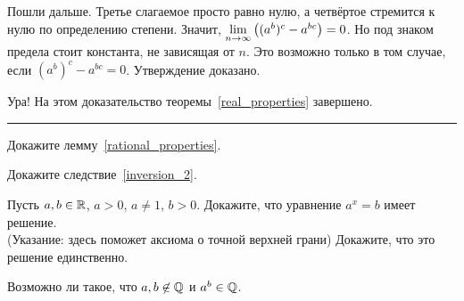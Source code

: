 \documentclass[a4paper,12pt,fleqn]{article}
\begin{document}
Пошли дальше. Третье слагаемое просто равно нулю, а четвёртое стремится к нулю по определению степени. Значит, $\lim\limits_{n \rightarrow \infty} \left((a^b)^c - a^{bc}\right) = 0$. Но под знаком предела стоит константа, не зависящая от $n$. Это возможно только в том случае, если $(a^b)^c - a^{bc} = 0$. Утверждение доказано.

\medskip

Ура! На этом доказательство теоремы~\ref{real_properties} завершено.

\bigskip
\hrule
\bigskip

Докажите лемму~\ref{rational_properties}.

Докажите следствие~\ref{inversion_2}.

Пусть $a,b \in \mathbb{R}$, $a > 0$, $a \ne 1$, $b > 0$.
Докажите, что уравнение $a^x = b$ имеет решение.\\
(Указание: здесь поможет аксиома о точной верхней грани)
Докажите, что это решение единственно.

Возможно ли такое, что $a, b \not\in \mathbb{Q}$ и $a^b \in \mathbb{Q}$.
\end{document}
